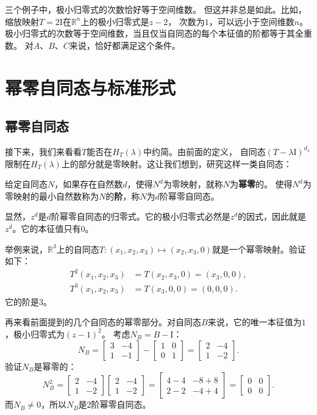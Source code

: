 \documentclass[12pt,UTF8]{ctexbook}
\begin{document}
三个例子中，极小归零式的次数恰好等于空间维数。
但这并非总是如此。比如，缩放映射$T = 2\mathrm{I}$在$\mathbb{R}^n$上的极小归零式是$z - 2$，
次数为$1$，可以远小于空间维数$n$。
极小归零式的次数等于空间维数，当且仅当自同态的每个本征值的阶都等于其全重数。
对$A$、$B$、$C$来说，恰好都满足这个条件。

\section{幂零自同态与标准形式}
\subsection{幂零自同态}
接下来，我们来看看$T$能否在$H_T(\lambda)$中约简。由前面的定义，
自同态$(T - \lambda\mathrm{I})^{d_\lambda}$限制在$H_T(\lambda)$上的部分就是零映射。这让我们想到，研究这样一类自同态：
\begin{df}\label{df:6_4_4}
    给定自同态$N$，如果存在自然数$d$，使得$N^d$为零映射，就称$N$为\textbf{幂零}的。
    使得$N^d$为零映射的最小自然数称为$N$的\textbf{阶}，称$N$为$d$阶幂零自同态。
\end{df}

显然，$z^d$是$d$阶幂零自同态的归零式。它的极小归零式必然是$z^d$的因式，因此就是$z^d$。它的本征值只有0。

举例来说，$\mathbb{R}^3$上的自同态$T: (x_1, x_2, x_3) \mapsto (x_2, x_3, 0)$就是一个幂零映射。验证如下：
\begin{align*}
    T^2(x_1, x_2, x_3) &= T(x_2, x_3, 0) = (x_3, 0, 0),  \\
    T^3(x_1, x_2, x_3) &= T(x_3, 0, 0) =  (0, 0, 0).
\end{align*}
它的阶是3。

再来看前面提到的几个自同态的幂零部分。对自同态$B$来说，它的唯一本征值为$1$，极小归零式为$(z-1)^2$。
考虑$N_B = B - \mathrm{I}$：
$$
N_B = \begin{bmatrix} 3 & -4 \\ 1 & -1 \end{bmatrix} - \begin{bmatrix} 1 & 0 \\ 0 & 1 \end{bmatrix} = \begin{bmatrix} 2 & -4 \\ 1 & -2 \end{bmatrix}.
$$
验证$N_B$是幂零的：
$$
N_B^2 = \begin{bmatrix} 2 & -4 \\ 1 & -2 \end{bmatrix}\begin{bmatrix} 2 & -4 \\ 1 & -2 \end{bmatrix} = \begin{bmatrix} 4-4 & -8+8 \\ 2-2 & -4+4 \end{bmatrix} = \begin{bmatrix} 0 & 0 \\ 0 & 0 \end{bmatrix}.
$$
而$N_B \neq 0$，所以$N_B$是$2$阶幂零自同态。
\end{document}
